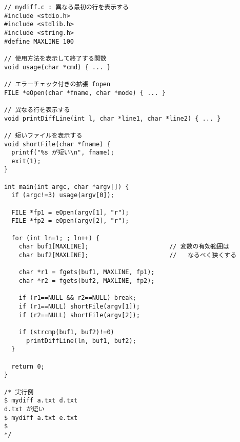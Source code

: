 \documentclass[a4j,dvipdfmx]{jarticle}
\begin{document}
%
\begin{lstlisting}[caption=mydiff の解答例（その２）]
// mydiff.c : 異なる最初の行を表示する
#include <stdio.h>
#include <stdlib.h>
#include <string.h>
#define MAXLINE 100

// 使用方法を表示して終了する関数
void usage(char *cmd) { ... }

// エラーチェック付きの拡張 fopen
FILE *eOpen(char *fname, char *mode) { ... }

// 異なる行を表示する
void printDiffLine(int l, char *line1, char *line2) { ... }

// 短いファイルを表示する
void shortFile(char *fname) {
  printf("%s が短い\n", fname);
  exit(1);
}

int main(int argc, char *argv[]) {
  if (argc!=3) usage(argv[0]);

  FILE *fp1 = eOpen(argv[1], "r");
  FILE *fp2 = eOpen(argv[2], "r");

  for (int ln=1; ; ln++) {
    char buf1[MAXLINE];                      // 変数の有効範囲は
    char buf2[MAXLINE];                      //   なるべく狭くする

    char *r1 = fgets(buf1, MAXLINE, fp1);
    char *r2 = fgets(buf2, MAXLINE, fp2);

    if (r1==NULL && r2==NULL) break;
    if (r1==NULL) shortFile(argv[1]);
    if (r2==NULL) shortFile(argv[2]);

    if (strcmp(buf1, buf2)!=0)
      printDiffLine(ln, buf1, buf2);
  }

  return 0;
}

/* 実行例
$ mydiff a.txt d.txt
d.txt が短い
$ mydiff a.txt e.txt
$
*/
\end{lstlisting}
\end{document}
